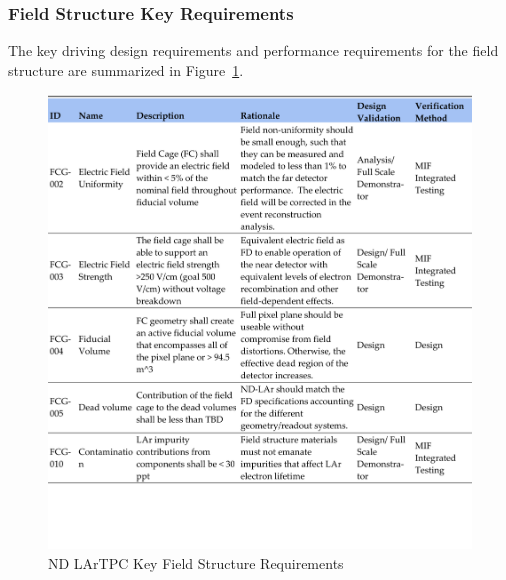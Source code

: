 \subsubsection{Field Structure Key Requirements}
\label{sec:lartpc-fs-req}
The key driving design requirements and performance requirements for the field structure are summarized in Figure~\ref{fig:lartpcfsreq}. 
\begin{figure}
\centering 
\includegraphics[width=1\linewidth]{graphics/lartpc/0Req/NDFCreqs1.pdf}
\caption{\label{fig:lartpcfsreq} ND LArTPC Key Field Structure Requirements}
\end{figure}

